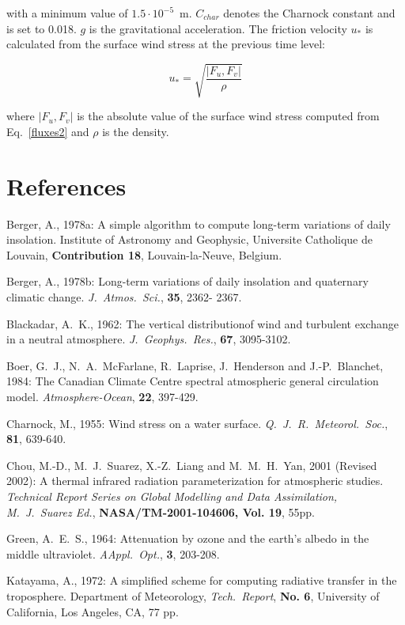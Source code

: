 with a minimum value of $1.5 \cdot 10^{-5}$~m. 
$C_{char}$ denotes the Charnock constant and  is set
to
0.018. $g$ is the gravitational acceleration. The
friction
velocity $u_{*}$ is calculated from the surface wind
stress at the previous time level:

\begin{equation}
u_{*}=\sqrt{\frac{|F_u, F_v|}{\rho} }
\end{equation}

where $|F_u, F_v| $ is the absolute value of the surface
wind stress computed from Eq.~\ref{fluxes2} and
$\rho$
is the density.
 
\newpage

\section{References}

Berger, A., 1978a: A simple algorithm to compute
long-term
variations of daily insolation. Institute of Astronomy
and
Geophysic, Universite Catholique de Louvain, {\bf
Contribution
18}, Louvain-la-Neuve, Belgium.

Berger, A., 1978b: Long-term variations of daily
insolation
and quaternary climatic change. {\it J.~Atmos.~Sci.},
{\bf 35}, 2362-
2367.

Blackadar, A.~K., 1962: The vertical distributionof
wind and turbulent exchange in a neutral
atmosphere. {\it J.~Geophys.~Res.}, {\bf 67},
3095-3102.

Boer, G.~J., N.~A.~McFarlane, R.~Laprise,
J.~Henderson and J.-P.~Blanchet, 1984: The
Canadian Climate Centre spectral atmospheric general
circulation model. {\it
Atmosphere-Ocean},
{\bf 22}, 397-429.

Charnock, M., 1955: Wind stress on a water surface.
{\it Q.~J.~R.~Meteorol.~Soc.}, {\bf
81}, 639-640.

Chou, M.-D.,  M.~J.~Suarez, X.-Z.~Liang and M.~M.~H.~Yan, 2001 (Revised 2002):
A thermal infrared radiation
parameterization for atmospheric studies. {\it Technical Report Series on Global Modelling and
Data Assimilation, M.~J.~Suarez Ed.}, {\bf NASA/TM-2001-104606, Vol.
19}, 55pp.

Green, A.~E.~S., 1964: Attenuation by ozone and the earth's albedo in the middle ultraviolet.
{\it AAppl.~Opt.}, {\bf 3}, 203-208.

Katayama, A., 1972: A simplified scheme for
computing
radiative transfer in the troposphere.
Department
of Meteorology, {\it Tech.~Report}, {\bf No. 6},
University of California, Los Angeles, CA,
77 pp.

